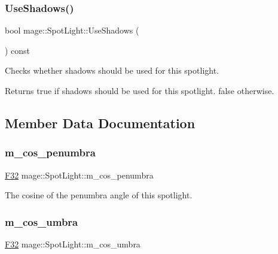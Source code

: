\subsubsection{\texorpdfstring{Use\+Shadows()}{UseShadows()}}
{\footnotesize\ttfamily bool mage\+::\+Spot\+Light\+::\+Use\+Shadows (\begin{DoxyParamCaption}{ }\end{DoxyParamCaption}) const\hspace{0.3cm}{\ttfamily [noexcept]}}

Checks whether shadows should be used for this spotlight.

\begin{DoxyReturn}{Returns}
{\ttfamily true} if shadows should be used for this spotlight. {\ttfamily false} otherwise. 
\end{DoxyReturn}


\subsection{Member Data Documentation}
\hypertarget{classmage_1_1_spot_light_ac4448bbc1c8a924141d2798c3365047a}{}\label{classmage_1_1_spot_light_ac4448bbc1c8a924141d2798c3365047a} 
\subsubsection{\texorpdfstring{m\+\_\+cos\+\_\+penumbra}{m\_cos\_penumbra}}
{\footnotesize\ttfamily \hyperlink{namespacemage_aa97e833b45f06d60a0a9c4fc22ae02c0}{F32} mage\+::\+Spot\+Light\+::m\+\_\+cos\+\_\+penumbra\hspace{0.3cm}{\ttfamily [private]}}

The cosine of the penumbra angle of this spotlight. \hypertarget{classmage_1_1_spot_light_aa2ec430d0f95d082112260b5d9640d50}{}\label{classmage_1_1_spot_light_aa2ec430d0f95d082112260b5d9640d50} 
\subsubsection{\texorpdfstring{m\+\_\+cos\+\_\+umbra}{m\_cos\_umbra}}
{\footnotesize\ttfamily \hyperlink{namespacemage_aa97e833b45f06d60a0a9c4fc22ae02c0}{F32} mage\+::\+Spot\+Light\+::m\+\_\+cos\+\_\+umbra\hspace{0.3cm}{\ttfamily [private]}}

